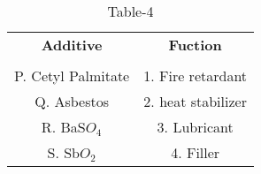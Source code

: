 \begin{table}[htbp]
  \centering
  \caption{Table-4}
  \label{tab:tables/table4.tex}
  \begin{tabular}{cc}
  \textbf{Additive} & \textbf{Fuction} \\ \\
    P. Cetyl Palmitate & 1. Fire retardant \\
    Q. Asbestos & 2. heat stabilizer\\
    R. BaS$O_4$ & 3. Lubricant \\
    S. Sb$O_2$ & 4. Filler \\
  \end{tabular}
\end{table}